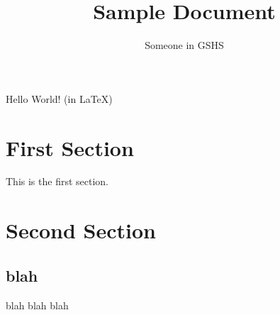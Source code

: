 \documentclass{article}
\title{Sample Document}
\author{Someone in GSHS}
\begin{document}
\maketitle
Hello World! (in \LaTeX)

\section{First Section}
This is the first section.

\section{Second Section}
\subsection{blah}
blah blah blah

	
\end{document}
